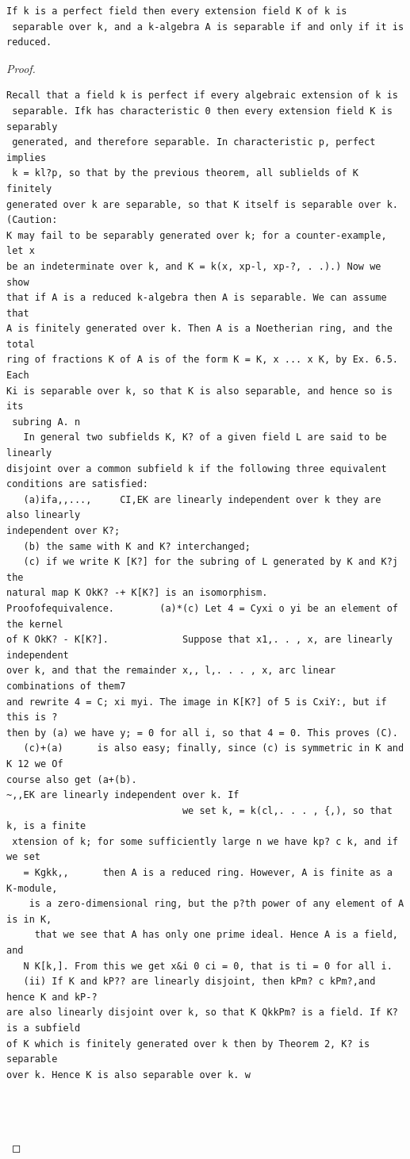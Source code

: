\begin{theorem}\label{mcrt-auto-theorem-26-3}\uses{}
\begin{verbatim}
If k is a perfect field then every extension field K of k is
 separable over k, and a k-algebra A is separable if and only if it is reduced.
\end{verbatim}
\end{theorem}
\begin{proof}
\begin{verbatim}
Recall that a field k is perfect if every algebraic extension of k is
 separable. Ifk has characteristic 0 then every extension field K is separably
 generated, and therefore separable. In characteristic p, perfect implies
 k = kl?p, so that by the previous theorem, all sublields of K finitely
generated over k are separable, so that K itself is separable over k. (Caution:
K may fail to be separably generated over k; for a counter-example, let x
be an indeterminate over k, and K = k(x, xp-l, xp-?, . .).) Now we show
that if A is a reduced k-algebra then A is separable. We can assume that
A is finitely generated over k. Then A is a Noetherian ring, and the total
ring of fractions K of A is of the form K = K, x ... x K, by Ex. 6.5. Each
Ki is separable over k, so that K is also separable, and hence so is its
 subring A. n
   In general two subfields K, K? of a given field L are said to be linearly
disjoint over a common subfield k if the following three equivalent
conditions are satisfied:
   (a)ifa,,...,     CI,EK are linearly independent over k they are also linearly
independent over K?;
   (b) the same with K and K? interchanged;
   (c) if we write K [K?] for the subring of L generated by K and K?j the
natural map K OkK? -+ K[K?] is an isomorphism.
Proofofequivalence.        (a)*(c) Let 4 = Cyxi o yi be an element of the kernel
of K OkK? - K[K?].             Suppose that x1,. . , x, are linearly independent
over k, and that the remainder x,, l,. . . , x, arc linear combinations of them7
and rewrite 4 = C; xi myi. The image in K[K?] of 5 is CxiY:, but if this is ?
then by (a) we have y; = 0 for all i, so that 4 = 0. This proves (C).
   (c)+(a)      is also easy; finally, since (c) is symmetric in K and K 12 we Of
course also get (a+(b).
~,,EK are linearly independent over k. If
                               we set k, = k(cl,. . . , {,), so that k, is a finite
 xtension of k; for some sufficiently large n we have kp? c k, and if we set
   = Kgkk,,      then A is a reduced ring. However, A is finite as a K-module,
    is a zero-dimensional ring, but the p?th power of any element of A is in K,
     that we see that A has only one prime ideal. Hence A is a field, and
   N K[k,]. From this we get x&i 0 ci = 0, that is ti = 0 for all i.
   (ii) If K and kP?? are linearly disjoint, then kPm? c kPm?,and hence K and kP-?
are also linearly disjoint over k, so that K QkkPm? is a field. If K? is a subfield
of K which is finitely generated over k then by Theorem 2, K? is separable
over k. Hence K is also separable over k. w




\end{verbatim}
\end{proof}
